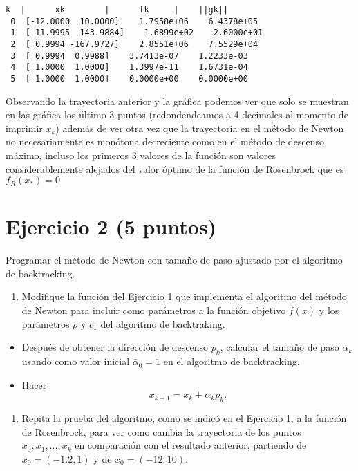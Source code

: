 \documentclass[11pt]{article}
\providecommand{\tightlist}{%
      \setlength{\itemsep}{0pt}\setlength{\parskip}{0pt}}
\begin{document}
    \begin{Verbatim}[commandchars=\\\{\}]
 k  |      xk        |      fk     |    ||gk||
 0  [-12.0000  10.0000]    1.7958e+06    6.4378e+05
 1  [-11.9995  143.9884]    1.6899e+02    2.6000e+01
 2  [ 0.9994 -167.9727]    2.8551e+06    7.5529e+04
 3  [ 0.9994  0.9988]    3.7413e-07    1.2233e-03
 4  [ 1.0000  1.0000]    1.3997e-11    1.6731e-04
 5  [ 1.0000  1.0000]    0.0000e+00    0.0000e+00
    \end{Verbatim}

    Observando la trayectoria anterior y la gráfica podemos ver que solo se
muestran en las gráfica los último 3 puntos (redondendeamos a 4
decimales al momento de imprimir \(x_k\)) además de ver otra vez que la
trayectoria en el método de Newton no necesariamente es monótona
decreciente como en el método de descenso máximo, incluso los primeros 3
valores de la función son valores considerablemente alejados del valor
óptimo de la función de Rosenbrock que es \(f_R(x_\ast)=0\)

    \hypertarget{ejercicio-2-5-puntos}{%
\section{Ejercicio 2 (5 puntos)}\label{ejercicio-2-5-puntos}}

Programar el método de Newton con tamaño de paso ajustado por el
algoritmo de backtracking.

\begin{enumerate}
\def\labelenumi{\arabic{enumi}.}
\tightlist
\item
  Modifique la función del Ejercicio 1 que implementa el algoritmo del
  método de Newton para incluir como parámetros a la función objetivo
  \(f(x)\) y los parámetros \(\rho\) y \(c_1\) del algoritmo de
  backtraking.
\end{enumerate}

\begin{itemize}
\tightlist
\item
  Después de obtener la dirección de descenso \(p_k\), calcular el
  tamaño de paso \(\alpha_k\) usando como valor inicial
  \(\bar{\alpha}_0 = 1\) en el algoritmo de backtracking.
\item
  Hacer \[x_{k+1} = x_k + \alpha_k p_k. \]
\end{itemize}

\begin{enumerate}
\def\labelenumi{\arabic{enumi}.}
\setcounter{enumi}{1}
\tightlist
\item
  Repita la prueba del algoritmo, como se indicó en el Ejercicio 1, a la
  función de Rosenbrock, para ver como cambia la trayectoria de los
  puntos \(x_0, x_1, ..., x_k\) en comparación con el resultado
  anterior, partiendo de \(x_0= (-1.2, 1)\) y de \(x_0= (-12, 10)\).
\end{enumerate}
\end{document}
